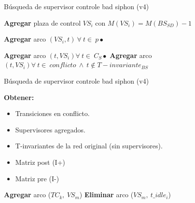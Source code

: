 \begin{algorithm}[H] 
  \caption{Búsqueda de supervisor controle bad siphon (v4)}
  \label{alg:algoritmo4} 
  \begin{algorithmic}[1]
 
 
    \State \textbf{Agregar} plaza de control $VS_i$ con $M(VS_i)= M(BS_{SD}) - 1$
    
            \State \textbf{Agregar} arco $(VS_i , t) \ \forall \  t \in \ p\bullet$
    \EndIf
 
    \State \textbf{Agregar} arco $(t, VS_i) \forall \ t \in \ C_S\bullet$
    \State \textbf{Agregar} arco $(t, VS_i)  \forall \ t \in \ conflicto \ \wedge \ t \notin T-invariante_{BS}$
  \end{algorithmic}
\end{algorithm}
\bigskip


\begin{algorithm}[H] 
  \caption{Búsqueda de supervisor controle bad siphon (v4)}
  \label{alg:algoritmo5} 
  \begin{algorithmic}[1]
 
    
    \State \textbf{Obtener:} 
    \begin{itemize}
        \item Transiciones en conflicto.
        \item Supervisores agregados.
        \item T-invariantes de la red original (sin supervisores).
        \item Matriz post (I+)
        \item Matriz pre (I-)
    \end{itemize}
    
                                \State \textbf{Agregar} arco ($TC_k, \ VS_m$)
                            \EndIf
                        \EndFor
                                \State \textbf{Eliminar} arco ($VS_m, \ t\_idle_i$) 
                            \EndIf
                        \EndIf
                    \EndIf
                \EndFor
            \EndIf
        \EndFor
    \EndFor
    
  \end{algorithmic}
\end{algorithm}
\bigskip

